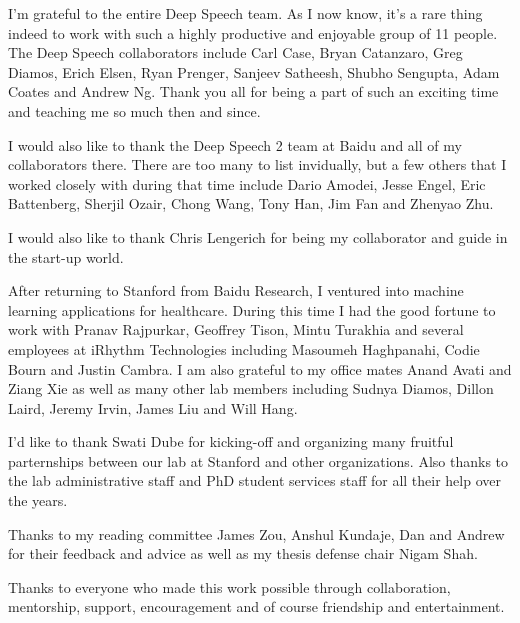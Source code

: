 I'm grateful to the entire Deep Speech team. As I now know, it's a rare thing
indeed to work with such a highly productive and enjoyable group of 11 people.
The Deep Speech collaborators include Carl Case, Bryan Catanzaro, Greg Diamos,
Erich Elsen, Ryan Prenger, Sanjeev Satheesh, Shubho Sengupta, Adam Coates and
Andrew Ng. Thank you all for being a part of such an exciting time and teaching
me so much then and since.

I would also like to thank the Deep Speech 2 team at Baidu and all of my
collaborators there. There are too many to list invidually, but a few others
that I worked closely with during that time include Dario Amodei, Jesse Engel,
Eric Battenberg, Sherjil Ozair, Chong Wang, Tony Han, Jim Fan and Zhenyao Zhu.

I would also like to thank Chris Lengerich for being my collaborator and guide
in the start-up world.

After returning to Stanford from Baidu Research, I ventured into machine
learning applications for healthcare. During this time I had the good fortune
to work with Pranav Rajpurkar, Geoffrey Tison, Mintu Turakhia and several
employees at iRhythm Technologies including Masoumeh Haghpanahi, Codie Bourn
and Justin Cambra. I am also grateful to my office mates Anand Avati and Ziang
Xie as well as many other lab members including Sudnya Diamos, Dillon Laird,
Jeremy Irvin, James Liu and Will Hang.

I'd like to thank Swati Dube for kicking-off and organizing many fruitful
parternships between our lab at Stanford and other organizations. Also thanks
to the lab administrative staff and PhD student services staff for all their
help over the years.

Thanks to my reading committee James Zou, Anshul Kundaje, Dan and Andrew for
their feedback and advice as well as my thesis defense chair Nigam Shah.

Thanks to everyone who made this work possible through collaboration,
mentorship, support, encouragement and of course friendship and entertainment.

\afterpreface

